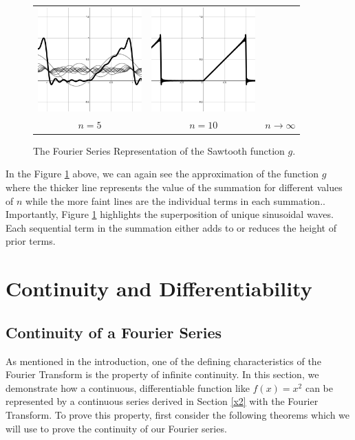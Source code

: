 \documentclass[11pt]{amsart}
\theoremstyle{plain}
\theoremstyle{definition}
\begin{document}
\begin{figure}[ht!]
\begin{tabular}{ccc}
  \includegraphics[width=40mm]{Images/complex_10.png} &
  \includegraphics[width=40mm]{Images/complex_full.png} \\
  $n=5$ & $n=10$ & $n\to\infty$\\[6pt]
\end{tabular}
\caption{\centering The Fourier Series Representation of the Sawtooth function $g$.}
\label{fig:complex}
\end{figure}

In the Figure \ref{fig:complex} above, we can again see the approximation of the function $g$ where the thicker line represents the value of the summation for different values of $n$ while the more faint lines are the individual terms in each summation.. Importantly, Figure \ref{fig:complex} highlights the superposition of unique sinusoidal waves. Each sequential term in the summation either adds to or reduces the height of prior terms.

\section{Continuity and Differentiability}

\subsection{Continuity of a Fourier Series}
As mentioned in the introduction, one of the defining characteristics of the Fourier Transform is the property of infinite continuity. In this section, we demonstrate how a continuous, differentiable function like $f(x)=x^2$ can be represented by a continuous series derived in Section \ref{x2} with the Fourier Transform. To prove this property, first consider the following theorems which we will use to prove the continuity of our Fourier series. 
\end{document}
